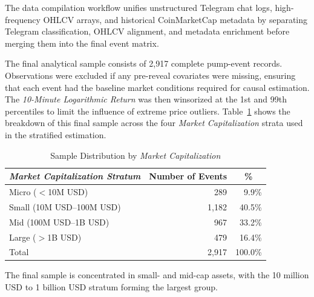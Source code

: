 The data compilation workflow unifies unstructured Telegram chat logs, high-frequency OHLCV arrays, and historical CoinMarketCap metadata by separating Telegram classification, OHLCV alignment, and metadata enrichment before merging them into the final event matrix.

The final analytical sample consists of 2,917 complete pump-event records. Observations were excluded if any pre-reveal covariates were missing, ensuring that each event had the baseline market conditions required for causal estimation. The \textit{10-Minute Logarithmic Return} was then winsorized at the 1st and 99th percentiles to limit the influence of extreme price outliers. Table~\ref{tab:sample-distribution} shows the breakdown of this final sample across the four \textit{Market Capitalization} strata used in the stratified estimation.

\begin{table}[H]
\centering
\caption{Sample Distribution by \textit{Market Capitalization}}
\label{tab:sample-distribution}
\begin{tabular}{|l|r|r|}
\toprule
\multicolumn{1}{|c|}{\textbf{\textit{Market Capitalization Stratum}}} & \multicolumn{1}{c|}{\textbf{Number of Events}} & \multicolumn{1}{c|}{\textbf{\%}} \\
\midrule
Micro ($<$10M USD) & 289 & 9.9\% \\
Small (10M USD--100M USD) & 1{,}182 & 40.5\% \\
Mid (100M USD--1B USD) & 967 & 33.2\% \\
Large ($>$1B USD) & 479 & 16.4\% \\
\midrule
Total & 2{,}917 & 100.0\% \\
\bottomrule
\end{tabular}
\end{table}

The final sample is concentrated in small- and mid-cap assets, with the 10 million USD to 1 billion USD stratum forming the largest group.

